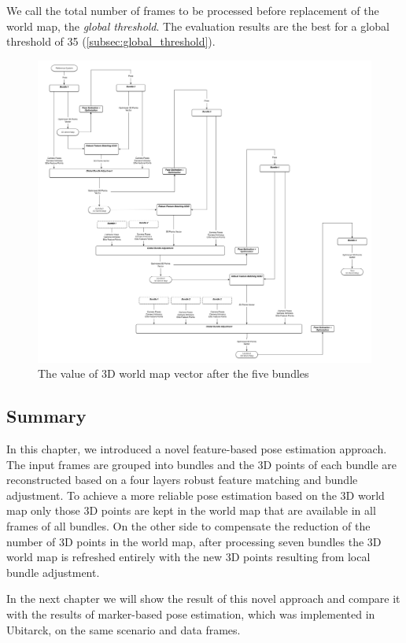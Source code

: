 We call the total number of frames to be processed before replacement of the world map, the \textit{global threshold}. The evaluation results are the best for a global threshold of 35 (\autoref{subsec:global_threshold}).

\begin{figure}[H]
  \centering
  \includegraphics[width=150mm]{figures/mapping}
  \caption{The value of 3D world map vector after the five bundles}\label{fig:mapping_concept}
\end{figure}

\subsection{Summary} \label{subsec:summary}

In this chapter, we introduced a novel feature-based pose estimation approach. The input frames are grouped into bundles and the 3D points of each bundle are reconstructed based on a four layers robust feature matching and bundle adjustment. To achieve a more reliable pose estimation based on the 3D world map only those 3D points are kept in the world map that are available in all frames of all bundles. On the other side to compensate the reduction of the number of 3D points in the world map, after processing seven bundles the 3D world map is refreshed entirely with the new 3D points resulting from local bundle adjustment. 


In the next chapter we will show the result of this novel approach and compare it with the results of marker-based pose estimation, which was implemented in Ubitarck, on the same scenario and data frames.
